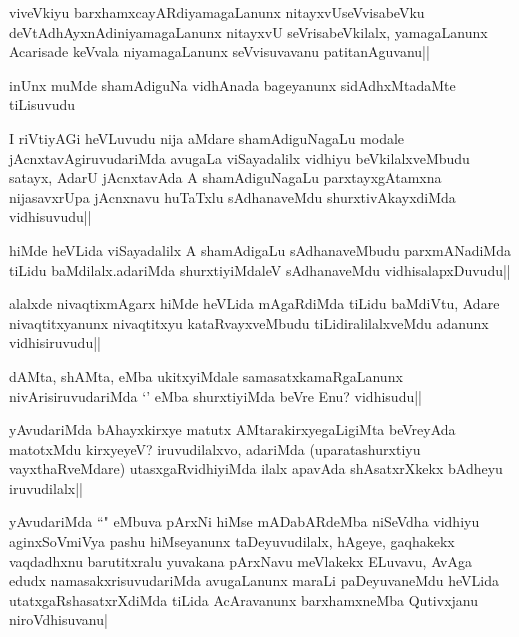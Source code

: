 \begin{artha}
viveVkiyu barxhamxcayARdiyamagaLanunx nitayxvUseVvisabeVku 
deVtAdhAyxnAdiniyamagaLanunx nitayxvU seVrisabeVkilalx, yamagaLanunx Acarisade keVvala 
niyamagaLanunx seVvisuvavanu patitanAguvanu||
\end{artha}

\begin{artha}
inUnx muMde shamAdiguNa vidhAnada bageyanunx sidAdhxMtadaMte tiLisuvudu
\end{artha}

\begin{artha}
I riVtiyAGi heVLuvudu nija aMdare shamAdiguNagaLu modale jAcnxtavAgiruvudariMda avugaLa viSayadalilx vidhiyu beVkilalxveMbudu satayx, AdarU jAcnxtavAda A shamAdiguNagaLu parxtayxgAtamxna nijasavxrUpa jAcnxnavu huTaTxlu sAdhanaveMdu shurxtivAkayxdiMda vidhisuvudu||
\end{artha}



\begin{artha}
hiMde heVLida viSayadalilx A shamAdigaLu sAdhanaveMbudu parxmANadiMda tiLidu baMdilalx.adariMda shurxtiyiMdaleV sAdhanaveMdu vidhisalapxDuvudu||
\end{artha}

\begin{artha}
alalxde nivaqtixmAgarx hiMde heVLida mAgaRdiMda tiLidu baMdiVtu, Adare nivaqtitxyanunx nivaqtitxyu kataRvayxveMbudu tiLidiralilalxveMdu adanunx vidhisiruvudu||
\end{artha}


\begin{artha}
dAMta, shAMta, eMba ukitxyiMdale samasatxkamaRgaLanunx nivArisiruvudariMda `\stext' eMba shurxtiyiMda beVre Enu? vidhisudu||
\end{artha}

\begin{artha}
yAvudariMda bAhayxkirxye matutx AMtarakirxyegaLigiMta beVreyAda matotxMdu kirxyeyeV? iruvudilalxvo, adariMda (uparatashurxtiyu vayxthaRveMdare) utasxgaRvidhiyiMda ilalx apavAda shAsatxrXkekx bAdheyu iruvudilalx||
\end{artha}


\begin{artha}
yAvudariMda ``\stext" eMbuva pArxNi hiMse mADabARdeMba niSeVdha vidhiyu aginxSoVmiVya pashu hiMseyanunx taDeyuvudilalx, hAgeye, gaqhakekx vaqdadhxnu barutitxralu yuvakana pArxNavu meVlakekx ELuvavu, AvAga edudx namasakxrisuvudariMda avugaLanunx maraLi paDeyuvaneMdu heVLida utatxgaRshasatxrXdiMda tiLida AcAravanunx barxhamxneMba Qutivxjanu niroVdhisuvanu|
\end{artha}

